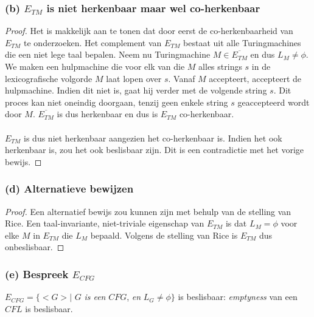\subsubsection*{(b) $E_{TM}$ is niet herkenbaar maar wel co-herkenbaar}

\begin{proof}
	Het is makkelijk aan te tonen dat door eerst de co-herkenbaarheid van $E_{TM}$ te onderzoeken. Het complement van $E_{TM}$ bestaat uit alle Turingmachines die een niet lege taal bepalen. Neem nu Turingmachine $M \in \overline{E_{TM}}$ en dus $L_M \neq \phi$. We maken een hulpmachine die voor elk van die $M$ alles strings $s$ in de lexicografische volgorde $M$ laat lopen over $s$. Vanaf $M$ accepteert, accepteert de hulpmachine. Indien dit niet is, gaat hij verder met de volgende string $s$.
	Dit proces kan niet oneindig doorgaan, tenzij geen enkele string $s$ geaccepteerd wordt door $M$. $\overline{E_{TM}}$ is dus herkenbaar en dus is $E_{TM}$ co-herkenbaar.
	\\\\
	$E_{TM}$ is dus niet herkenbaar aangezien het co-herkenbaar is. Indien het ook herkenbaar is, zou het ook beslisbaar zijn. Dit is een contradictie met het vorige bewijs.
\end{proof}

\subsubsection*{(d) Alternatieve bewijzen}

\begin{proof}
	Een alternatief bewijs zou kunnen zijn met behulp van de stelling van Rice. Een taal-invariante, niet-triviale eigenschap van $E_{TM}$ is dat $L_M = \phi$ voor elke $M$ in $E_{TM}$ die $L_M$ bepaald. Volgens de stelling van Rice is $E_{TM}$ dus onbeslisbaar.
\end{proof}

\subsubsection*{(e) Bespreek $E_{CFG}$}

\begin{theorem}
	$E_{CFG} = \{ <G> |$ $G$ \textit{is een} $CFG$, \textit{en} $L_G \neq \phi \}$ is beslisbaar: \textit{emptyness} van een $CFL$ is beslisbaar.
\end{theorem}

